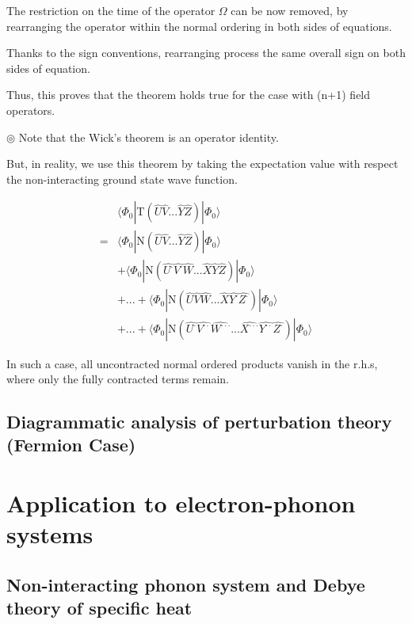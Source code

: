﻿\documentclass[twoside]{book}
\numberwithin{equation}{section}
\begin{document}
The restriction on the time of the operator $\Omega$ can be now removed, by rearranging the operator within the normal ordering in both sides of equations.

Thanks to the sign conventions, rearranging process the same overall sign on both sides of equation.

Thus, this proves that the theorem holds true for the case with (n+1) field operators.

$\circledcirc$ Note that the Wick's theorem is an operator identity.

But, in reality, we use this theorem by taking the expectation value with respect the non-interacting ground state wave function.

\begin{align}
&\langle \Phi_0|\mathrm{T}(\hat{U}\hat{V}...\hat{Y}\hat{Z})|\Phi_0\rangle\nonumber\\
=&\langle \Phi_0|\mathrm{N}(\hat{U}\hat{V}...\hat{Y}\hat{Z})|\Phi_0\rangle\nonumber\\
&+\langle \Phi_0|\mathrm{N}(\hat{U^{\cdot}}\hat{V^{\cdot}}\hat{W}...\hat{X}\hat{Y}\hat{Z})|\Phi_0\rangle\nonumber\\
&+...+\langle \Phi_0|\mathrm{N}(\hat{U}\hat{V}\hat{W}...\hat{X}\hat{Y^{\cdot}}\hat{Z^{\cdot}})|\Phi_0\rangle\nonumber\\
&+...+\langle \Phi_0|\mathrm{N}(\hat{U^{\cdot}}\hat{V^{\cdot\cdot}}\hat{W^{\cdot\cdot\cdot}}...\hat{X^{\cdot\cdot\cdot}}\hat{Y^{\cdot\cdot}}\hat{Z^{\cdot}})|\Phi_0\rangle\nonumber
\end{align}

In such a case, all uncontracted normal ordered products vanish in the r.h.s, where only the fully contracted terms remain.

\section{Diagrammatic analysis of perturbation theory (Fermion Case)}





\chapter{Application to electron-phonon systems}

\section{Non-interacting phonon system and Debye theory of specific heat}
\end{document}
